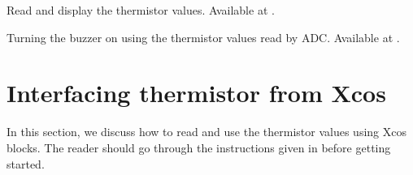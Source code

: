 \begin{scicode}
   {Read and display
    the thermistor values.  Available at
    .}
  \label{sci:therm-read}
  
\end{scicode}

\begin{scicode}
  {Turning the buzzer on using the thermistor values read by
    ADC.  Available at .}
  \label{sci:therm-buzzer}
  
\end{scicode}

\section{Interfacing thermistor from Xcos}
In this section, we discuss how to read and use the thermistor values using
Xcos blocks. The reader should go
through the instructions given in  before
getting started.

